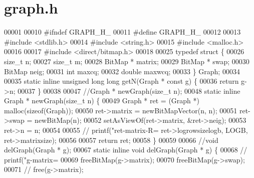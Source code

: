 \section{graph.\+h}
\label{graph_8h_source}

\begin{DoxyCode}
00001 
00010 \textcolor{preprocessor}{#ifndef GRAPH\_H\_}
00011 \textcolor{preprocessor}{#define GRAPH\_H\_}
00012 
00013 \textcolor{preprocessor}{#include <stdlib.h>}
00014 \textcolor{preprocessor}{#include <string.h>}
00015 \textcolor{preprocessor}{#include <malloc.h>}
00016 
00017 \textcolor{preprocessor}{#include <direct/bitmap.h>}
00018 
00025 \textcolor{keyword}{typedef} \textcolor{keyword}{struct }\{
00026         \textcolor{keywordtype}{size\_t}          n;                              
00027         \textcolor{keywordtype}{size\_t}          m;                              
00028         BitMap *        matrix;                 
00029         BitMap *        swap;                   
00030         BitMap          neig;                   
00031         \textcolor{keywordtype}{int}             maxcq;                  
00032         \textcolor{keywordtype}{double}          maxwcq;                 
00033 \} Graph;
00034 
00035 \textcolor{keyword}{static} \textcolor{keyword}{inline} \textcolor{keywordtype}{unsigned} \textcolor{keywordtype}{long} \textcolor{keywordtype}{long} getN(Graph * \textcolor{keyword}{const} g) \{
00036         \textcolor{keywordflow}{return} g->n;
00037 \}
00038 
00047 \textcolor{comment}{//Graph * newGraph(size\_t n);}
00048 \textcolor{keyword}{static} \textcolor{keyword}{inline} Graph * newGraph(\textcolor{keywordtype}{size\_t} n) \{
00049         Graph * ret = (Graph *) malloc(\textcolor{keyword}{sizeof}(Graph));
00050         ret->matrix = newBitMapVector(n, n);
00051         ret->swap = newBitMap(n);
00052         setAsViewOf(ret->matrix, &ret->neig);
00053         ret->n = n;
00054 
00055 \textcolor{comment}{//      printf("ret-matrix-R=%
       ret->logrowsizelogb, LOGB, ret->matrixsize);}
00056 
00057         \textcolor{keywordflow}{return} ret;
00058 \}
00059 
00066 \textcolor{comment}{//void delGraph(Graph * g);}
00067 \textcolor{keyword}{static} \textcolor{keyword}{inline} \textcolor{keywordtype}{void} delGraph(Graph * g) \{
00068 \textcolor{comment}{//      printf("g-matrix=%
00069         freeBitMap(g->matrix);
00070         freeBitMap(g->swap);
00071 \textcolor{comment}{//      free(g->matrix);}
}
\end{DoxyCode}
